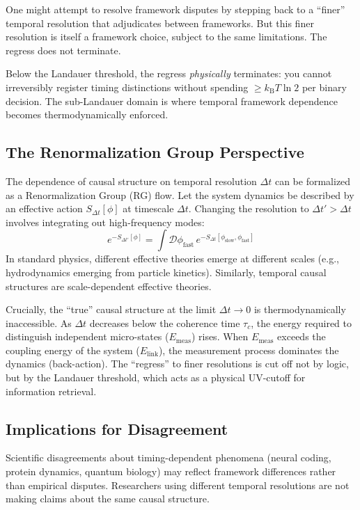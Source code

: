 \documentclass[12pt]{article}
\numberwithin{equation}{section}
\newcommand{\kB}{k_{\mathrm{B}}}
\begin{document}
One might attempt to resolve framework disputes by stepping back to a ``finer'' temporal resolution that adjudicates between frameworks. But this finer resolution is itself a framework choice, subject to the same limitations. The regress does not terminate.

Below the Landauer threshold, the regress \emph{physically} terminates: you cannot irreversibly register timing distinctions without spending $\ge \kB T\ln 2$ per binary decision. The sub-Landauer domain is where temporal framework dependence becomes thermodynamically enforced.

\subsection{The Renormalization Group Perspective}

The dependence of causal structure on temporal resolution $\Delta t$ can be formalized as a Renormalization Group (RG) flow. Let the system dynamics be described by an effective action $S_{\Delta t}[\phi]$ at timescale $\Delta t$. Changing the resolution to $\Delta t' > \Delta t$ involves integrating out high-frequency modes:
\begin{equation}
e^{-S_{\Delta t'}[\phi]} = \int \mathcal{D}\phi_{\text{fast}} \, e^{-S_{\Delta t}[\phi_{\text{slow}}, \phi_{\text{fast}}]}
\end{equation}
In standard physics, different effective theories emerge at different scales (e.g., hydrodynamics emerging from particle kinetics). Similarly, temporal causal structures are scale-dependent effective theories.

Crucially, the ``true'' causal structure at the limit $\Delta t \to 0$ is thermodynamically inaccessible. As $\Delta t$ decreases below the coherence time $\tau_c$, the energy required to distinguish independent micro-states ($E_{\text{meas}}$) rises. When $E_{\text{meas}}$ exceeds the coupling energy of the system ($E_{\text{link}}$), the measurement process dominates the dynamics (back-action). The ``regress'' to finer resolutions is cut off not by logic, but by the Landauer threshold, which acts as a physical UV-cutoff for information retrieval.

\subsection{Implications for Disagreement}

Scientific disagreements about timing-dependent phenomena (neural coding, protein dynamics, quantum biology) may reflect framework differences rather than empirical disputes. Researchers using different temporal resolutions are not making claims about the same causal structure.
\end{document}
